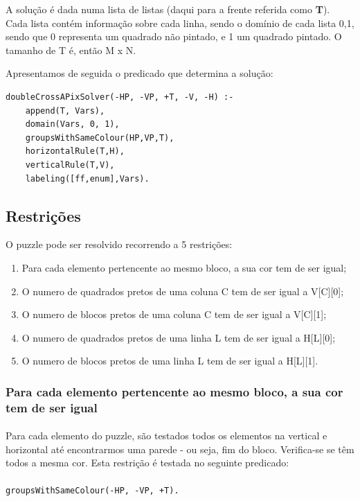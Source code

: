 \documentclass[runningheads,a4paper]{llncs}
\begin{document}
A solução é dada numa lista de listas (daqui para a frente referida como \textbf{T}). Cada lista contém informação sobre cada linha, sendo o domínio de cada lista {0,1}, sendo que 0 representa um quadrado não pintado, e 1 um quadrado pintado. O tamanho de T é, então M x N.

Apresentamos de seguida o predicado que determina a solução:

\begin{lstlisting}
doubleCrossAPixSolver(-HP, -VP, +T, -V, -H) :-	
	append(T, Vars),
	domain(Vars, 0, 1),
	groupsWithSameColour(HP,VP,T),
	horizontalRule(T,H),
	verticalRule(T,V),
	labeling([ff,enum],Vars).
\end{lstlisting}

\subsection{Restrições}

O puzzle pode ser resolvido recorrendo a 5 restrições:

\begin{enumerate}
\item Para cada elemento pertencente ao mesmo bloco, a sua cor tem de ser igual;
\item O numero de quadrados pretos de uma coluna C tem de ser igual a V[C][0];
\item O numero de blocos pretos de uma coluna C tem de ser igual a V[C][1];
\item O numero de quadrados pretos de uma linha L tem de ser igual a H[L][0];
\item O numero de blocos pretos de uma linha L tem de ser igual a H[L][1].
\end{enumerate}

\subsubsection{Para cada elemento pertencente ao mesmo bloco, a sua cor tem de ser igual}
\paragraph{}
Para cada elemento do puzzle, são testados todos os elementos na vertical e horizontal até encontrarmos uma parede - ou seja, fim do bloco. Verifica-se se têm todos a mesma cor.
Esta restrição é testada no seguinte predicado:
\paragraph{}
\begin{lstlisting}
groupsWithSameColour(-HP, -VP, +T).
\end{lstlisting}
\end{document}

